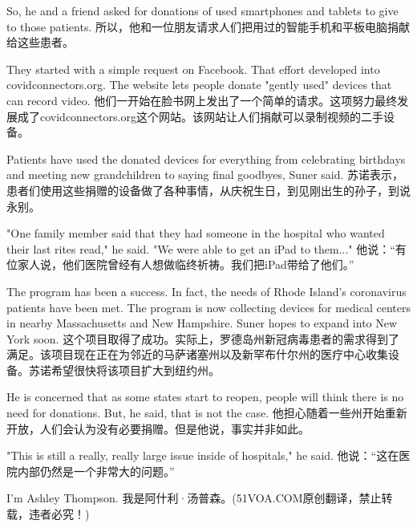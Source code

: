 So, he and a friend asked for donations of used smartphones and tablets to give to those patients.
所以，他和一位朋友请求人们把用过的智能手机和平板电脑捐献给这些患者。

They started with a simple request on Facebook. That effort developed into covidconnectors.org. The website lets people donate "gently used" devices that can record video.
他们一开始在脸书网上发出了一个简单的请求。这项努力最终发展成了covidconnectors.org这个网站。该网站让人们捐献可以录制视频的二手设备。

Patients have used the donated devices for everything from celebrating birthdays and meeting new grandchildren to saying final goodbyes, Suner said.
苏诺表示，患者们使用这些捐赠的设备做了各种事情，从庆祝生日，到见刚出生的孙子，到说永别。

"One family member said that they had someone in the hospital who wanted their last rites read," he said. "We were able to get an iPad to them..."
他说：“有位家人说，他们医院曾经有人想做临终祈祷。我们把iPad带给了他们。”

The program has been a success. In fact, the needs of Rhode Island's coronavirus patients have been met. The program is now collecting devices for medical centers in nearby Massachusetts and New Hampshire. Suner hopes to expand into New York soon.
这个项目取得了成功。实际上，罗德岛州新冠病毒患者的需求得到了满足。该项目现在正在为邻近的马萨诸塞州以及新罕布什尔州的医疗中心收集设备。苏诺希望很快将该项目扩大到纽约州。

He is concerned that as some states start to reopen, people will think there is no need for donations. But, he said, that is not the case.
他担心随着一些州开始重新开放，人们会认为没有必要捐赠。但是他说，事实并非如此。

"This is still a really, really large issue inside of hospitals," he said.
他说：“这在医院内部仍然是一个非常大的问题。”

I'm Ashley Thompson.
我是阿什利·汤普森。(51VOA.COM原创翻译，禁止转载，违者必究！)
